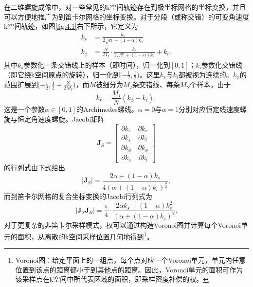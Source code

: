 \documentclass[12pt]{article}
\let\originallautoref\autoref
\renewcommand{\autoref}[1]{\allowbreak\originallautoref{#1}}
\begin{document}
在二维螺旋成像中，对一些常见的k空间轨迹存在到极坐标网格的坐标变换，并且可以方便地推广为到笛卡尔网格的坐标变换。对于分段（或称交错）的可变角速度k空间轨迹，如图\autoref{fig:4.1}右下所示，它定义为
\begin{equation}
    \begin{aligned}
        k_r&=\frac{k_s}{2\sqrt{\alpha}+(1-\alpha)k_s}\\
        k_\phi&=\frac{N}{M_I}\cdot\frac{k_s}{2\sqrt{\alpha}+(1-\alpha)k_s}+k_i,
    \end{aligned}
    \label{equ:4.44}
\end{equation}
其中$k_s$参数化一条交错线上的样本（即时间），归一化到$[0,1]$；$k_i$参数化交错线（即它绕k空间原点的旋转），归一化到$[-\frac{1}{2},\frac{1}{2})$。这里$k_s$与$k_i$都被视为连续的。$k_\phi$的范围扩展到$[-\frac{1}{2},\frac{1}{2}+\frac{N}{2M_I})$，而$M$被细分为$M_I$条交错线、每条$M_S$个样本。由于
\begin{equation}
    k_r=\frac{M_I}{N}(k_\phi-k_i),
    \label{equ:4.45}
\end{equation}
这是一个参数$\alpha\in[0,1]$的Archimedes螺线。$\alpha=0$与$\alpha=1$分别对应恒定线速度螺旋与恒定角速度螺旋。Jacobi矩阵
\begin{equation}
    \mathbf{J}_S=\begin{bmatrix}
        \dfrac{\partial k_r}{\partial k_s} & \dfrac{\partial k_r}{\partial k_i}\\[3mm]
        \dfrac{\partial k_\phi}{\partial k_s} & \dfrac{\partial k_\phi}{\partial k_i}
    \end{bmatrix}
    \label{equ:4.46}
\end{equation}
的行列式由下式给出
\begin{equation}
    |\mathbf{J}_S|=\frac{2\alpha+(1-\alpha)k_s}{4\left(\alpha+(1-\alpha)k_s\right)^{\frac{3}{2}}},
    \label{equ:4.47}
\end{equation}
而到笛卡尔网格的复合坐标变换的Jacobi行列式为
\begin{equation}
    |\mathbf{J}_S\mathbf{J}_R|=\frac{\pi}{4}\cdot\frac{2\alpha k_s+(1-\alpha)k_s^2}{\left(\alpha+(1-\alpha)k_s\right)^2}.
    \label{equ:4.48}
\end{equation}
对于更复杂的非笛卡尔采样模式，权可以通过构造Voronoi图并计算每个Voronoi单元的面积，从离散的k空间采样位置几何地得到\footnote{Voronoi图：给定平面上的一组点，每个点对应一个Voronoi单元，单元内任意位置到该点的距离都小于到其他点的距离。因此，Voronoi单元的面积可作为该采样点在k空间中所代表区域的面积，即采样密度补偿的权。}。
\end{document}
